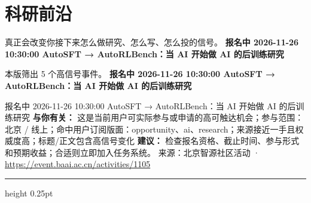 \documentclass[10.5pt]{ctexart}
\begin{document}
\section*{科研前沿}
{\color{ormuted} 真正会改变你接下来怎么做研究、怎么写、怎么投的信号。}
\vspace{2mm}
{\LARGE\bfseries 报名中 2026-11-26 10:30:00 AutoSFT → AutoRLBench：当 AI 开始做 AI 的后训练研究}\par
\vspace{1mm}
{\color{ormuted} 本版筛出 5 个高信号事件。}
\vspace{3mm}
{\Large\bfseries 报名中 2026-11-26 10:30:00 AutoSFT → AutoRLBench：当 AI 开始做 AI 的后训练研究}\par
报名中 2026-11-26 10:30:00 AutoSFT → AutoRLBench：当 AI 开始做 AI 的后训练研究
\textbf{与你有关：} 这是当前用户可实际参与或申请的高可触达机会；参与范围：北京 / 线上；命中用户订阅版面：opportunity、ai、research；来源接近一手且权威度高；标题/正文包含高信号变化
\textbf{建议：} 检查报名资格、截止时间、参与形式和预期收益；合适则立即加入任务系统。
{\footnotesize\color{ormuted} 来源：北京智源社区活动 · \url{https://event.baai.ac.cn/activities/1105}}
\vspace{4mm}
\hrule height 0.25pt
\vspace{3mm}
\end{document}
